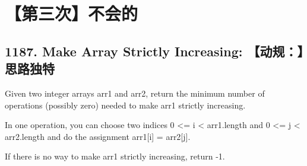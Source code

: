 \documentclass[9pt, b5paaper]{book}
\begin{document}
\section{【第三次】不会的}
\label{sec-1-7}
\subsection{1187. Make Array Strictly Increasing: 【动规：】思路独特}
\label{sec-1-7-1}
Given two integer arrays arr1 and arr2, return the minimum number of operations (possibly zero) needed to make arr1 strictly increasing.

In one operation, you can choose two indices 0 <= i < arr1.length and 0 <= j < arr2.length and do the assignment arr1[i] = arr2[j].

If there is no way to make arr1 strictly increasing, return -1.
\end{document}
